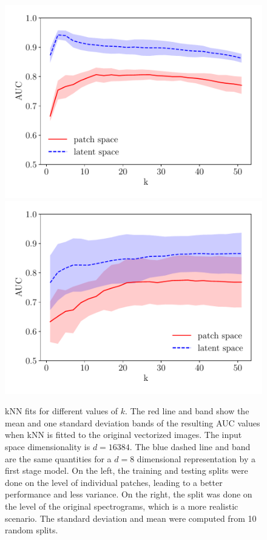 \begin{figure}
\centering
\includegraphics[scale=0.45]{data/chapter_alfven/split_patches.pdf}
\includegraphics[scale=0.45]{data/chapter_alfven/split_spectrograms.pdf}
\caption{kNN fits for different values of $k$. The red line and band show the mean and one standard deviation bands of the resulting AUC values when kNN is fitted to the original vectorized images. The input space dimensionality is $d=16384$. The blue dashed line and band are the same quantities for a $d=8$ dimensional representation by a first stage model. On the left, the training and testing splits were done on the level of individual patches, leading to a better performance and less variance. On the right, the split was done on the level of the original spectrograms, which is a more realistic scenario. The standard deviation and mean were computed from 10 random splits.}
\label{fig:patches_latent}
\end{figure}

